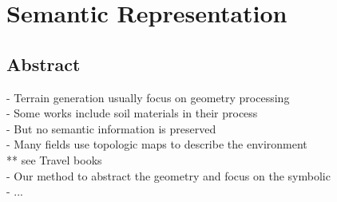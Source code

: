 \part{Semantic Representation}
\label{part:semantic-representation}

\chapter*{Abstract}
\label{chap:semantic-representation_abstract}
- Terrain generation usually focus on geometry processing \\
- Some works include soil materials in their process \\
- But no semantic information is preserved \\
- Many fields use topologic maps to describe the environment \\
** see Travel books \\
- Our method to abstract the geometry and focus on the symbolic \\
- ... 





